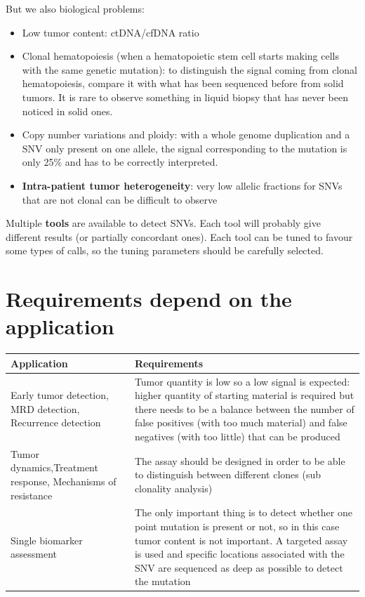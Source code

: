 But we also biological problems:

\begin{itemize}
    \item Low tumor content: ctDNA/cfDNA ratio
    \item Clonal hematopoiesis (when a hematopoietic stem cell starts making cells with the same genetic mutation): to distinguish the signal coming from clonal hematopoiesis, compare it with what has been sequenced before from solid tumors. It is rare to observe something in liquid biopsy that has never been noticed in solid ones.
    \item Copy number variations and ploidy: with a whole genome duplication and a SNV only present on one allele, the signal corresponding to the mutation is only 25\% and has to be correctly interpreted.
    \item \textbf{Intra-patient tumor heterogeneity}: very low allelic fractions for SNVs that are not clonal can be difficult to observe
\end{itemize}

Multiple \textbf{tools} are available to detect SNVs. Each tool will probably give different results (or partially concordant ones). Each tool can be tuned to favour some types of calls, so the tuning parameters should be carefully selected.

\section{Requirements depend on the application}

\begin{tabular}{ | p{6cm} | p{10cm} | }
 \hline
 \textbf{Application} & \textbf{Requirements} \\
 \hline
  Early tumor detection, MRD detection, Recurrence detection & Tumor quantity is low so a low signal is expected: higher quantity of starting material is required but there needs to be a 			balance between the number of false positives (with too much material) and false negatives (with too little) that can be produced \\
 \hline
	Tumor dynamics,Treatment response, Mechanisms of resistance & The assay should be designed in order to be able to distinguish between different clones (sub clonality analysis) \\
 \hline
 Single biomarker assessment & The only important thing is to detect whether one point mutation is present or not, so in this case tumor content is not important. A targeted assay is used and specific locations associated with the SNV are sequenced as deep as possible to detect the mutation \\
 \hline
\end{tabular}

